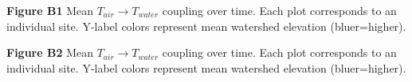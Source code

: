 \documentclass[notitlepage]{article}
\begin{document}
\begin{center}
\end{center}
\textbf{Figure B1} Mean $T_{air}\rightarrow T_{water}$ coupling over time. Each plot corresponds to an individual site. Y-label colors represent mean watershed elevation (bluer=higher).

\begin{center}
\end{center}
\textbf{Figure B2} Mean $T_{air}\rightarrow T_{water}$ coupling over time. Each plot corresponds to an individual site. Y-label colors represent mean watershed elevation (bluer=higher).
\end{document}
